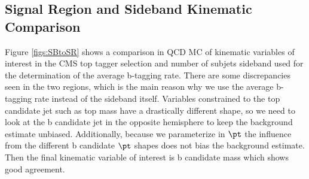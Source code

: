 


\subsection{Signal Region and Sideband Kinematic Comparison}
\label{sec:SBvsSR}
Figure \ref{figs:SBtoSR} shows a comparison in QCD MC of kinematic variables of interest in the CMS top tagger selection and number of subjets sideband used for the determination of the average b-tagging rate.  There are some discrepancies 
seen in the two regions, which is the main reason why we use the average b-tagging rate instead of the sideband itself.  Variables constrained to the top candidate jet such as top mass have a drastically different shape, so we need to look at the 
b candidate jet in the opposite hemisphere to keep the background estimate unbiased.  Additionally, because we parameterize in $\pt$ the influence from the different b candidate $\pt$ shapes does not bias the background estimate.  Then the final 
kinematic variable of interest is b candidate mass which shows good agreement.  


